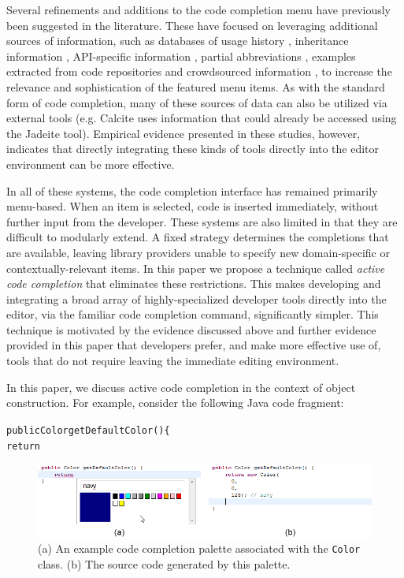 \documentclass[10pt, conference, compsocconf]{IEEEtran}
\begin{document}
Several refinements and additions to the code completion menu have previously been suggested in the literature. These have focused on leveraging additional sources of information, such as databases of usage history \cite{robbes_how_2008}\cite{HouPletcher2011}, inheritance information \cite{HouPletcher2011}, API-specific information \cite{HouPletcher2011}\cite{Lee+2008}, partial abbreviations \cite{Han+2009}, examples extracted from code repositories \cite{bruch_learning_2009} and crowdsourced information \cite{mooty_calcite:_2010}, to increase the relevance and sophistication of the featured menu items. As with the standard form of code completion, many of these sources of data can also be utilized via external tools (e.g. Calcite \cite{mooty_calcite:_2010} uses information that could already be accessed using the Jadeite \cite{conf/vl/StylosFYM09} tool). Empirical evidence presented in these studies, however, indicates that directly integrating these kinds of tools directly into the editor environment can be more effective.

In all of these systems, the code completion interface has remained primarily menu-based. When an item is selected, code is inserted immediately, without further input from the developer. These systems are also limited in that they are difficult to modularly extend. A fixed strategy determines the completions that are available, leaving library providers unable to specify new domain-specific or contextually-relevant items. 
In this paper we propose a technique called {\it active code completion} that eliminates these restrictions. This  makes developing and integrating a broad array of highly-specialized developer tools directly into the editor, via the familiar code completion command, significantly simpler. This technique is motivated by the evidence discussed above and further evidence provided in this paper that developers prefer, and make more effective use of, tools that do not require leaving the immediate editing environment.

In this paper, we discuss active code completion in the context of object construction. For example, consider the following Java code fragment:

\begin{alltt}
  public Color getDefaultColor() \{
      return \textvisiblespace
\end{alltt}

\begin{figure}\label{color}
\begin{center}
\includegraphics[scale=0.8]{color_palette.png}\end{center}
\caption{(a) An example code completion palette associated with the \texttt{Color} class. (b) The source code generated by this palette.}
\end{figure}
\end{document}
